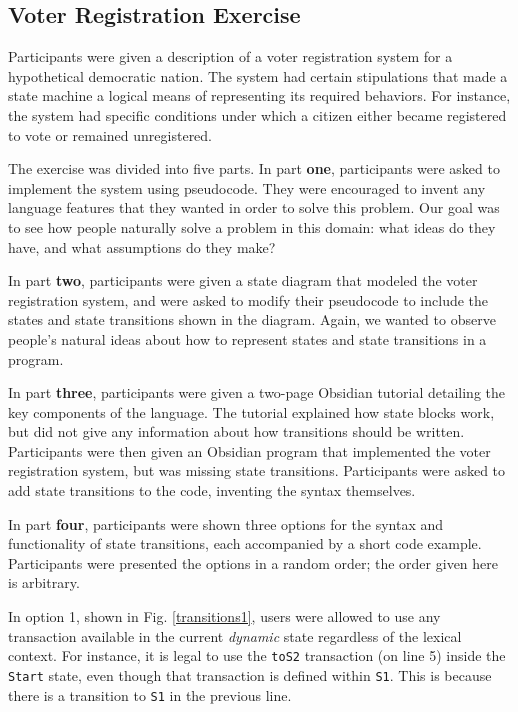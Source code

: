 \documentclass[sigplan,10pt,review]{acmart}\settopmatter{printfolios=true}
\begin{document}
\subsection{Voter Registration Exercise}

Participants were given a description of a voter registration system for a hypothetical democratic nation. The 
system had certain stipulations that made a state machine a logical means of representing its required behaviors. 
For instance, the system had specific conditions under which a citizen either became registered to vote 
or remained unregistered. 

The exercise was divided into five parts. In part \textbf{one}, participants were asked to implement the system using 
pseudocode. They were encouraged to invent any language features that they wanted in order to solve this 
problem. Our goal was to see how people naturally solve a problem in this domain: what ideas do they 
have, and what assumptions do they make? 
	
In part \textbf{two}, participants were given a state diagram that modeled the voter registration system, and were asked to 
modify their pseudocode to include the states and state transitions shown in the diagram. Again, we wanted to 
observe people's natural ideas about how to represent states and state transitions in a program.

In part \textbf{three}, participants were given a two-page Obsidian tutorial detailing the key components of the language. 
The tutorial explained how state blocks work, but did not give any information about how transitions should be 
written. Participants were then given an Obsidian program that implemented the voter registration system, but was 
missing state transitions. Participants were asked to add state transitions to the code, inventing the syntax 
themselves.

In part \textbf{four}, participants were shown three options for the syntax and functionality of state transitions, each 
accompanied by a short code example. Participants were presented the options in a random order; the order given 
here is arbitrary.

In option 1, shown in Fig. \ref{transitions1}, users were allowed to use any transaction available in the current \textit{dynamic} state regardless of the lexical context. For instance, it is legal to use the \texttt{\small{toS2}} transaction (on line 5) inside the \texttt{\small{Start}} 
state, even though that transaction is defined within \texttt{\small{S1}}. This is because there is a transition to 
\texttt{\small{S1}} in the previous line.
\end{document}
